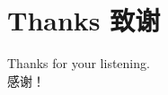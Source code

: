 \section{Thanks 致谢}
\begin{frame}
	\ftitle{\textcolor{white}{End}}
	Thanks for your listening. \\
	感谢！
\end{frame}

